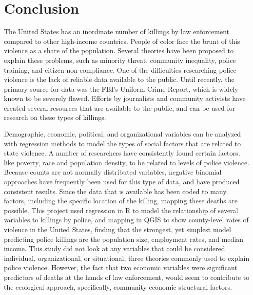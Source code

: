 \documentclass[sigconf]{acmart}
\begin{document}
\section{Conclusion}
The United States has an inordinate number of killings by law enforcement compared to other high-income countries.  People of color face the brunt of this violence as a share of the population.  Several theories have been proposed to explain these problems, such as minority threat, community inequality, police training, and citizen non-compliance.  One of the difficulties researching police violence is the lack of reliable data available to the public.  Until recently, the primary source for data was the FBI's Uniform Crime Report, which is widely known to be severely flawed.  Efforts by journalists and community activists have created several resources that are available to the public, and can be used for research on these types of killings.

Demographic, economic, political, and organizational variables can be analyzed with regression methods to model the types of social factors that are related to state violence.  A number of researchers have consistently found certain factors, like poverty, race and population density, to be related to levels of police violence.  Because counts are not normally distributed variables, negative binomial approaches have frequently been used for this type of data, and have produced consistent results.  Since the data that is available has been coded to many factors, including the specific location of the killing, mapping these deaths are possible.  This project used regression in R to model the relationship of several variables to killings by police, and mapping in QGIS to show county-level rates of violence in the United States, finding that the strongest, yet simplest model predicting police killings are the population size, employment rates, and median income.  This study did not look at any variables that could be considered individual, organizational, or situational, three theories commonly used to explain police violence.  However, the fact that two economic variables were significant predictors of deaths at the hands of law enforcement, would seem to contribute to the ecological approach, specifically, community economic structural factors.


 
\end{document}
